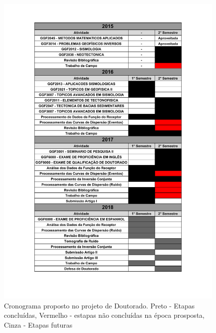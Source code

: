 \begin{figure}[!ht]
\begin{center}
\includegraphics[width=1\textwidth]{Fig/cronograma.pdf}
\caption{Cronograma proposto no projeto de Doutorado. Preto - Etapas concluídas, Vermelho - estapas não concluídas na época prosposta, Cinza - Etapas futuras}
\label{mapa_sta_mantle}
\end{center}
\end{figure}